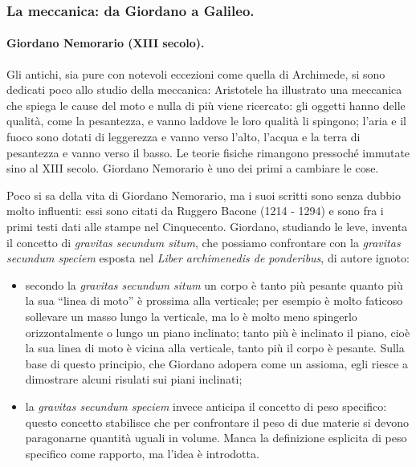 \subsubsection{La meccanica: da Giordano a Galileo.}\label{LaMeccanicaDaGiordanoAGalileo}
\paragraph{Giordano Nemorario (XIII secolo).} Gli antichi, sia pure con notevoli eccezioni come quella di Archimede, si sono dedicati poco allo studio della meccanica: Aristotele ha illustrato una meccanica che spiega le cause del moto e nulla di pi\`u viene ricercato: gli oggetti hanno delle qualit\`a, come la pesantezza, e vanno laddove le loro qualit\`a li spingono; l'aria e il fuoco sono dotati di leggerezza e vanno verso l'alto, l'acqua e la terra di pesantezza e vanno verso il basso. Le teorie fisiche rimangono pressoch\'e immutate sino al XIII secolo. Giordano Nemorario \`e uno dei primi a cambiare le cose.
\par Poco si sa della vita di Giordano Nemorario, ma i suoi scritti sono senza dubbio molto influenti: essi sono citati da Ruggero Bacone (1214 - 1294) e sono fra i primi testi dati alle stampe nel Cinquecento. Giordano, studiando le leve, inventa il concetto di \textit{gravitas secundum situm}, che possiamo confrontare con la \textit{gravitas secundum speciem} esposta nel \textit{Liber archimenedis de ponderibus}, di autore ignoto:
\begin{itemize}
	\item secondo la \textit{gravitas secundum situm} un corpo \`e tanto pi\`u pesante quanto pi\`u la sua ``linea di moto'' \`e prossima alla verticale; per esempio \`e molto faticoso sollevare un masso lungo la verticale, ma lo \`e molto meno spingerlo orizzontalmente o lungo un piano inclinato; tanto pi\`u \`e inclinato il piano, cio\`e la sua linea di moto \`e vicina alla verticale, tanto pi\`u il corpo \`e pesante. Sulla base di questo principio, che Giordano adopera come un assioma, egli riesce a dimostrare alcuni risulati sui piani inclinati;
	\item la \textit{gravitas secundum speciem} invece anticipa il concetto di peso specifico: questo concetto stabilisce che per confrontare il peso di due materie si devono paragonarne quantit\`a uguali in volume. Manca la definizione esplicita di peso specifico come rapporto, ma l'idea \`e introdotta.
\end{itemize}
